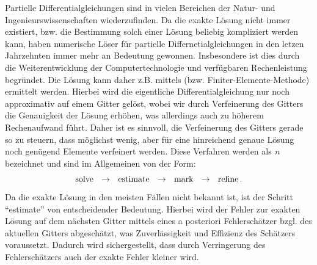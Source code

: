 \label{kap:1}


Partielle Differentialgleichungen sind in vielen Bereichen der Natur- und Ingenieurswissenschaften wiederzufinden. Da die exakte Lösung nicht immer existiert, bzw. die Bestimmung solch einer Lösung beliebig kompliziert werden kann, haben numerische Löser für partielle Differnetialgleichungen in den letzen Jahrzehnten immer mehr an Bedeutung gewonnen. Insbesondere ist dies durch die Weiterentwicklung der Computertechnologie und verfügbaren Rechenleistung begründet. Die Lösung kann daher z.B. mittels  (bzw. Finiter-Elemente-Methode) ermittelt werden. Hierbei wird die eigentliche Differentialgleichung nur noch approximativ auf einem Gitter gelöst, wobei wir durch Verfeinerung des Gitters die Genauigkeit der Lösung erhöhen, was allerdings auch zu höherem Rechenaufwand führt. Daher ist es sinnvoll, die Verfeinerung des Gitters gerade so zu steuern, dass möglichst wenig, aber für eine hinreichend genaue Lösung noch genügend Elemente verfeinert werden. Diese Verfahren werden als \textit{n} bezeichnet und sind im Allgemeinen von der Form:
\[
	\text{solve}\ \ \ra \ \ \text{estimate}\ \ \ra\ \ \text{mark}\ \ \ra\  \ \text{refine} \, .
\]
Da die exakte Lösung in den meisten Fällen nicht bekannt ist, ist der Schritt "`estimate"' von entscheidender Bedeutung. Hierbei wird der Fehler zur exakten Lösung auf dem nächsten Gitter mittels eines a posteriori Fehlerschätzer bzgl. des aktuellen Gitters abgeschätzt, was Zuverlässigkeit und Effizienz des Schätzers voraussetzt. Dadurch wird sichergestellt, dass durch Verringerung des Fehlerschätzers auch  der exakte Fehler kleiner wird. 

